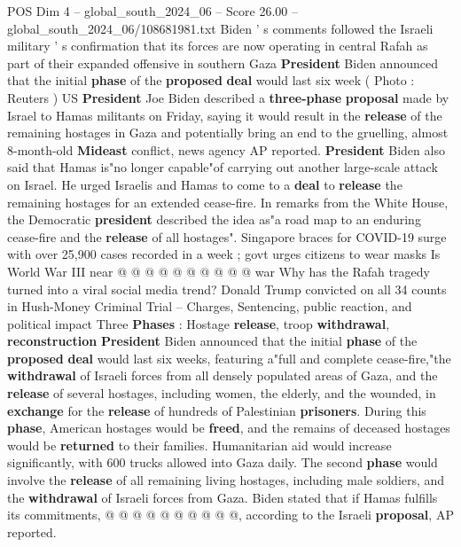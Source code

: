 \begin{textsample}{POS Dim 4 – global\_south\_2024\_06 – Score 26.00 – global\_south\_2024\_06/108681981.txt}  \label{ex:f4_pos_083}
Biden ' s comments followed the Israeli military ' s confirmation that its forces are now operating in central Rafah as part of their expanded offensive in southern Gaza \textbf{President} Biden announced that the initial \textbf{phase} of the \textbf{proposed} \textbf{deal} would last six week ( Photo : Reuters ) US \textbf{President} Joe Biden described a \textbf{three-phase} \textbf{proposal} made by Israel to Hamas militants on Friday, saying it would result in the \textbf{release} of the remaining hostages in Gaza and potentially bring an end to the gruelling, almost 8-month-old \textbf{Mideast} conflict, news agency AP reported. \textbf{President} Biden also said that Hamas is"no longer capable"of carrying out another large-scale attack on Israel.
He urged Israelis and Hamas to come to a \textbf{deal} to \textbf{release} the remaining hostages for an extended cease-fire.
In remarks from the White House, the Democratic \textbf{president} described the idea as"a road map to an enduring cease-fire and the \textbf{release} of all hostages".
Singapore braces for COVID-19 surge with over 25,900 cases recorded in a week ; govt urges citizens to wear masks Is World War III near @ @ @ @ @ @ @ @ @ @ war Why has the Rafah tragedy turned into a viral social media trend?
Donald Trump convicted on all 34 counts in Hush-Money Criminal Trial -- Charges, Sentencing, public reaction, and political impact Three \textbf{Phases} : Hostage \textbf{release}, troop \textbf{withdrawal}, \textbf{reconstruction} \textbf{President} Biden announced that the initial \textbf{phase} of the \textbf{proposed} \textbf{deal} would last six weeks, featuring a"full and complete cease-fire,"the \textbf{withdrawal} of Israeli forces from all densely populated areas of Gaza, and the \textbf{release} of several hostages, including women, the elderly, and the wounded, in \textbf{exchange} for the \textbf{release} of hundreds of Palestinian \textbf{prisoners}.
During this \textbf{phase}, American hostages would be \textbf{freed}, and the remains of deceased hostages would be \textbf{returned} to their families.
Humanitarian aid would increase significantly, with 600 trucks allowed into Gaza daily.
The second \textbf{phase} would involve the \textbf{release} of all remaining living hostages, including male soldiers, and the \textbf{withdrawal} of Israeli forces from Gaza.
Biden stated that if Hamas fulfills its commitments, @ @ @ @ @ @ @ @ @ @, according to the Israeli \textbf{proposal}, AP reported.

\end{textsample}
